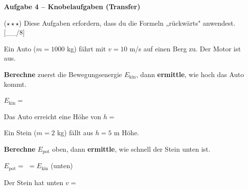 \documentclass[11pt, a4paper]{article}
\newcommand{\luecke}[1]{\underline{\hspace{#1}}}
\newcommand{\punktebox}[1]{\hfill\small\textcolor{mittelgrau}{[\_\_/#1]}}
\newcommand{\aufgabe}[1]{%
    \needspace{4\baselineskip}%
    \vspace{10pt}%
    \noindent\textbf{\textcolor{fachfarbe}{Aufgabe #1}}%
    \vspace{4pt}%
    \nopagebreak[4]%
}
\newcommand{\operator}[1]{\textbf{\textcolor{fachfarbe}{#1}}}
\begin{document}
\vspace{0.8em}

\aufgabe{4 – Knobelaufgaben (Transfer)}

($\star\star\star$) Diese Aufgaben erfordern, dass du die Formeln „rückwärts" anwendest. \punktebox{8}

\begin{teil}
\item Ein Auto ($m = 1000$ kg) fährt mit $v = 10$ m/s auf einen Berg zu. Der Motor ist aus.

\operator{Berechne} zuerst die Bewegungsenergie $E_\text{kin}$, dann \operator{ermittle}, wie hoch das Auto kommt.

\vspace{0.3em}
$E_\text{kin} = $ \luecke{6cm}

\vspace{0.5em}
Das Auto erreicht eine Höhe von $h = $ \luecke{2cm}

\vspace{3cm}

\item Ein Stein ($m = 2$ kg) fällt aus $h = 5$ m Höhe.

\operator{Berechne} $E_\text{pot}$ oben, dann \operator{ermittle}, wie schnell der Stein unten ist.

\vspace{0.3em}
$E_\text{pot} = $ \luecke{6cm} $= E_\text{kin}$ (unten)

\vspace{0.5em}
Der Stein hat unten $v = $ \luecke{2cm}
\end{teil}

\vspace{1em}

\end{document}
